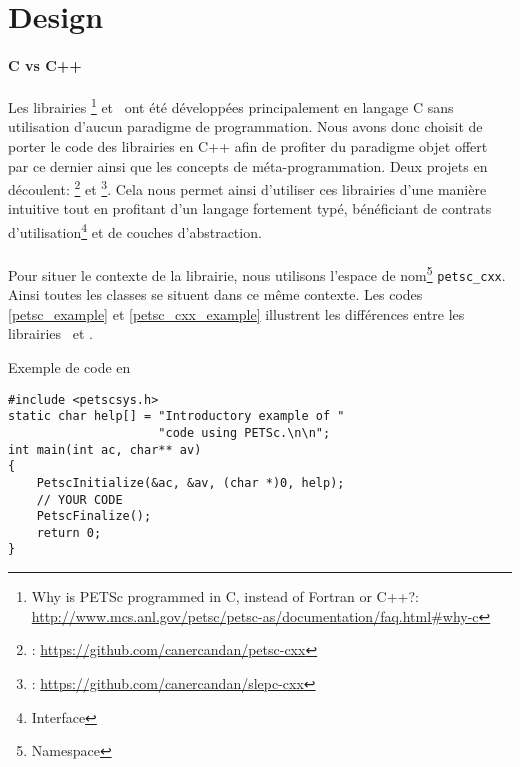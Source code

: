 %

\section{Design}

\paragraph{C vs C++}

Les librairies \petsc\footnote{Why is PETSc programmed in C, instead of Fortran or C++?: \url{http://www.mcs.anl.gov/petsc/petsc-as/documentation/faq.html#why-c}} et \slepc\ ont été développées principalement en langage C sans utilisation d'aucun paradigme de programmation. Nous avons donc choisit de porter le code des librairies en C++ afin de profiter du paradigme objet offert par ce dernier ainsi que les concepts de méta-programmation. Deux projets en découlent: \petscx\footnote{\petscx: \url{https://github.com/canercandan/petsc-cxx}} et \slepcx\footnote{\slepcx: \url{https://github.com/canercandan/slepc-cxx}}. Cela nous permet ainsi d'utiliser ces librairies d'une manière intuitive tout en profitant d'un langage fortement typé, bénéficiant de contrats d'utilisation\footnote{Interface} et de couches d'abstraction.

\paragraph{\petscx}

Pour situer le contexte de la librairie, nous utilisons l'espace de nom\footnote{Namespace} \verb#petsc_cxx#. Ainsi toutes les classes se situent dans ce même contexte. Les codes \ref{petsc_example} et \ref{petsc_cxx_example} illustrent les différences entre les librairies \petsc\ et \petscx.

\begin{algorithm}[h]
  \caption{Exemple de code en \petsc}
  \label{petsc_example}
\begin{verbatim}
#include <petscsys.h>
static char help[] = "Introductory example of "
                     "code using PETSc.\n\n";
int main(int ac, char** av)
{
    PetscInitialize(&ac, &av, (char *)0, help);
    // YOUR CODE
    PetscFinalize();
    return 0;
}
\end{verbatim}
\end{algorithm}

